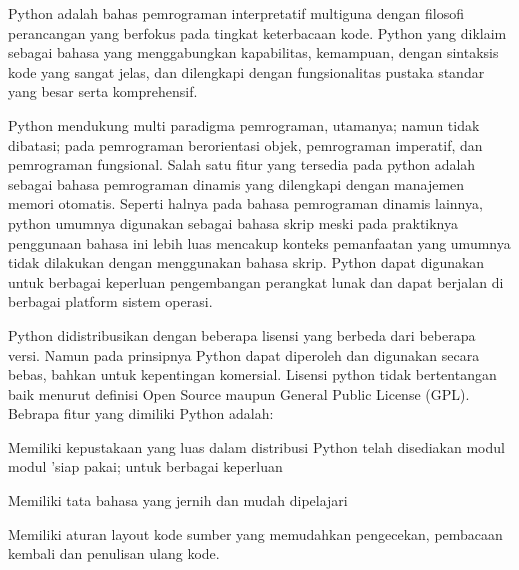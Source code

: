\vspace{14pt}
\noindent 
{\fontsize{14pt}{14pt}\selectfont Python adalah bahas pemrograman interpretatif multiguna dengan filosofi perancangan yang berfokus pada tingkat keterbacaan kode. Python yang diklaim sebagai bahasa yang menggabungkan kapabilitas, kemampuan, dengan sintaksis kode yang sangat jelas, dan dilengkapi dengan fungsionalitas pustaka standar yang besar serta komprehensif. \\} \par
\noindent 
{\fontsize{14pt}{14pt}\selectfont \vspace{\baselineskip}
Python mendukung multi paradigma pemrograman, utamanya; namun tidak dibatasi; pada pemrograman berorientasi objek, pemrograman imperatif, dan pemrograman fungsional. Salah satu fitur yang tersedia pada python adalah sebagai bahasa pemrograman dinamis yang dilengkapi dengan manajemen memori otomatis. Seperti halnya pada bahasa pemrograman dinamis lainnya, python umumnya digunakan sebagai bahasa skrip meski pada praktiknya penggunaan bahasa ini lebih luas mencakup konteks pemanfaatan yang umumnya tidak dilakukan dengan menggunakan bahasa skrip. Python dapat digunakan untuk berbagai keperluan pengembangan perangkat lunak dan dapat berjalan di berbagai platform sistem operasi. \\} \par
\noindent 
{\fontsize{14pt}{14pt}\selectfont Python didistribusikan dengan beberapa lisensi yang berbeda dari beberapa versi. Namun pada prinsipnya Python dapat diperoleh dan digunakan secara bebas, bahkan untuk kepentingan komersial. Lisensi python tidak bertentangan baik menurut definisi Open Source maupun General Public License (GPL).\vspace{\baselineskip}
Bebrapa fitur yang dimiliki Python adalah: \\} \par
\noindent 
{\fontsize{14pt}{14pt}\selectfont Memiliki kepustakaan yang luas dalam distribusi Python telah disediakan modul modul 'siap pakai; untuk berbagai keperluan \\} \par
\noindent 
{\fontsize{14pt}{14pt}\selectfont Memiliki tata bahasa yang jernih dan mudah dipelajari \\} \par
\noindent 
{\fontsize{14pt}{14pt}\selectfont Memiliki aturan layout kode sumber yang memudahkan pengecekan, pembacaan kembali dan penulisan ulang kode.  \\} \par
